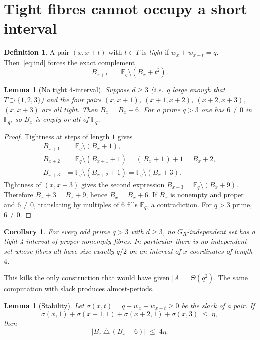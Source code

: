\documentclass[11pt]{article}
\newtheorem{lemma}[theorem]{Lemma}
\newtheorem{corollary}[theorem]{Corollary}
\theoremstyle{definition}
\newtheorem{definition}[theorem]{Definition}
\newcommand{\F}{\mathbb{F}}
\begin{document}
\section{Tight fibres cannot occupy a short interval}

\begin{definition}
A pair $(x,x+t)$ with $t\in T$ is \emph{tight} if $w_x+w_{x+t}=q$.
Then~\eqref{eq:ind} forces the exact complement
\[
  B_{x+t}\;=\;\F_q\setminus(B_x+t^{2}).
\]
\end{definition}

\begin{lemma}[No tight 4-interval]\label{lem:4int}
Suppose $d\ge 3$ (i.e.\ $q$ large enough that $T\supset\{1,2,3\}$) and the four pairs
$(x,x+1)$, $(x+1,x+2)$, $(x+2,x+3)$, $(x,x+3)$
are all tight.
Then $B_x=B_x+6$. For a prime $q>3$ one has $6\neq 0$ in $\F_q$, so $B_x$ is empty or all of $\F_q$.
\end{lemma}

\begin{proof}
Tightness at steps of length $1$ gives
\begin{align*}
  B_{x+1}
  &=\F_q\setminus(B_x+1),\\
  B_{x+2}
  &=\F_q\setminus(B_{x+1}+1)
  =(\,B_x+1\,)+1
  =B_x+2,\\
  B_{x+3}
  &=\F_q\setminus(B_{x+2}+1)
  =\F_q\setminus(B_x+3).
\end{align*}
Tightness of $(x,x+3)$ gives the second expression
$B_{x+3}=\F_q\setminus(B_x+9)$.
Therefore $B_x+3=B_x+9$, hence $B_x=B_x+6$.
If $B_x$ is nonempty and proper and $6\neq 0$, translating by multiples of $6$ fills $\F_q$, a contradiction. For $q>3$ prime, $6\neq 0$.
\end{proof}

\begin{corollary}\label{cor:4int}
For every odd prime $q>3$ with $d\ge 3$, no $G_R$-independent set has a tight 4-interval of proper nonempty fibres.
In particular there is no independent set whose fibres all have size exactly $q/2$ on an interval of $x$-coordinates of length $4$.
\end{corollary}

This kills the only construction that would have given $|A|=\Theta(q^{2})$.
The same computation with slack produces almost-periods.

\begin{lemma}[Stability]\label{lem:stab}
Let $\sigma(x,t)=q-w_x-w_{x+t}\ge 0$ be the slack of a pair.
If
\[
  \sigma(x,1)+\sigma(x+1,1)+\sigma(x+2,1)+\sigma(x,3)\;\le\;\eta,
\]
then
\[
  \bigl|B_x\,\triangle\,(B_x+6)\bigr|\;\le\;4\eta.
\]
\end{lemma}
\end{document}
